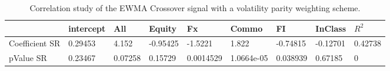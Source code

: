 \begin{table}[H]
\centering
\begin{tabular}{lllllllll}
\hline& intercept & All & Equity & Fx & Commo & FI & InClass & $R^{2}$ \\ 
\hline 
Coefficient SR & 0.29453 & 4.152 & -0.95425 & -1.5221 & 1.822 & -0.74815 & -0.12701 & 0.42738 \\ 
pValue SR & 0.23467 & 0.07258 & 0.15729 & 0.0014529 & 1.0664e-05 & 0.038939 & 0.67185 & 0 \\ 
\hline
\end{tabular}
\caption{Correlation study of the EWMA Crossover signal with a volatility parity weighting scheme.}
\label{MBBSVPOQ_CORR}
\end{table}